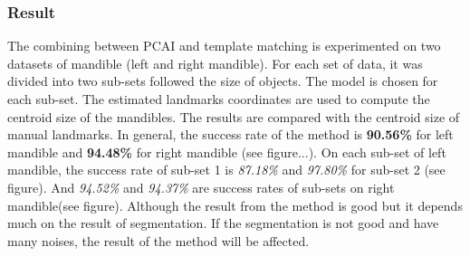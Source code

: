 \subsubsection{Result}
The combining between PCAI and template matching is experimented on two datasets of mandible (left and right mandible). For each set of data, it was divided into two sub-sets followed the size of objects. The model is chosen for each sub-set. The estimated landmarks coordinates are used to compute the centroid size of the mandibles. The results are compared with the centroid size of manual landmarks. In general, the success rate of the method is \textbf{90.56\%} for left mandible and \textbf{94.48\%} for right mandible (see figure...). On each sub-set of left mandible, the success rate of sub-set 1 is \textit{87.18\%} and \textit{97.80\%} for sub-set 2 (see figure). And \textit{94.52\%} and \textit{94.37\%} are success rates of sub-sets on right mandible(see figure).
Although the result from the method is good but it depends much on the result of segmentation. If the segmentation is not good and have many noises, the result of the method will be affected.
